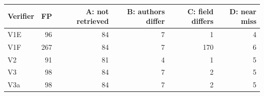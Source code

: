 \begin{tabular}{lrrrrr}
\toprule
Verifier & FP & A: not retrieved & B: authors differ & C: field differs & D: near miss \\
\midrule
V1E & 96 & 84 & 7 & 1 & 4 \\
V1F & 267 & 84 & 7 & 170 & 6 \\
V2 & 91 & 81 & 4 & 1 & 5 \\
V3 & 98 & 84 & 7 & 2 & 5 \\
V3a & 98 & 84 & 7 & 2 & 5 \\
\bottomrule
\end{tabular}
